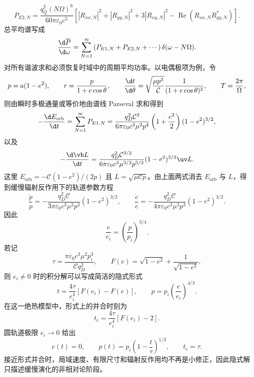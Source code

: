 \begin{equation*}
	P_{E2,N}
	=\frac{q_Q^2(N\Omega)^6}{60\pi\varepsilon_0c^5}
	\left[
	|R_{xx,N}|^2+|R_{yy,N}|^2+3|R_{xy,N}|^2
	-\operatorname{Re}(R_{xx,N}R_{yy,N}^*)
	\right].
\end{equation*}
总平均谱写成
\begin{equation*}
	\frac{\d\overline P}{\d\omega}
	=\sum_{N=1}^{\infty}
	\left(P_{E1,N}+P_{E2,N}+\cdots\right)
	\delta(\omega-N\Omega).
\end{equation*}
对所有谐波求和必须恢复时域中的周期平均功率。以电偶极项为例，令
\begin{equation*}
	p=a(1-e^2),
	\qquad
	r=\frac{p}{1+e\cos\theta},
	\qquad
	\frac{\d t}{\d\theta}
	=\sqrt{\frac{\mu p^3}{\mathcal C}}
	\frac{1}{(1+e\cos\theta)^2},
	\qquad
	T=\frac{2\pi}{\Omega},
\end{equation*}
则由瞬时多极通量或等价地由谱线 Parseval 求和得到
\begin{equation*}
	-\frac{\d E_{\mathrm{orb}}}{\d t}
	=\sum_{N=1}^{\infty}P_{E1,N}
	=\frac{q_D^2\mathcal C^2}
	{6\pi\varepsilon_0c^3\mu^2p^4}
	\left(1+\frac{e^2}{2}\right)(1-e^2)^{3/2},
\end{equation*}
以及
\begin{equation*}
	-\frac{\d\vb L}{\d t}
	=\frac{q_D^2\mathcal C^{3/2}}
	{6\pi\varepsilon_0c^3\mu^{3/2}p^{5/2}}
	(1-e^2)^{3/2}\uv L.
\end{equation*}
这里 $E_{\mathrm{orb}}=-\mathcal C(1-e^2)/(2p)$ 且 $L=\sqrt{\mu\mathcal C p}$。由上面两式消去 $E_{\mathrm{orb}}$ 与 $L$，得到缓慢辐射反作用下的轨道参数方程
\begin{equation*}
	\frac{\dot p}{p}
	=-\frac{q_D^2\mathcal C}{3\pi\varepsilon_0c^3\mu^2p^3}(1-e^2)^{3/2},
	\qquad
	\frac{\dot e}{e}
	=-\frac{q_D^2\mathcal C}{4\pi\varepsilon_0c^3\mu^2p^3}(1-e^2)^{3/2}.
\end{equation*}
因此
\begin{equation*}
	\frac{e}{e_i}=\left(\frac{p}{p_i}\right)^{3/4}.
\end{equation*}
若记
\begin{equation*}
	\tau=\frac{\pi\varepsilon_0c^3\mu^2p_i^3}{\mathcal Cq_D^2},
	\qquad
	F(e)=\sqrt{1-e^2}+\frac{1}{\sqrt{1-e^2}},
\end{equation*}
则 $e_i\neq0$ 时的积分解可以写成简洁的隐式形式
\begin{equation*}
	t=\frac{4\tau}{e_i^4}\left[F(e_i)-F(e)\right],
	\qquad
	p=p_i\left(\frac{e}{e_i}\right)^{4/3}.
\end{equation*}
在这一绝热模型中，形式上的并合时刻为
\begin{equation*}
	t_{\mathrm c}
	=\frac{4\tau}{e_i^4}\left[F(e_i)-2\right].
\end{equation*}
圆轨道极限 $e_i\to0$ 给出
\begin{equation*}
	e(t)=0,
	\qquad
	p(t)=p_i\left(1-\frac{t}{\tau}\right)^{1/3},
	\qquad
	t_{\mathrm c}=\tau.
\end{equation*}
接近形式并合时，局域速度、有限尺寸和辐射反作用均不再是小修正，因此隐式解只描述缓慢演化的非相对论阶段。

